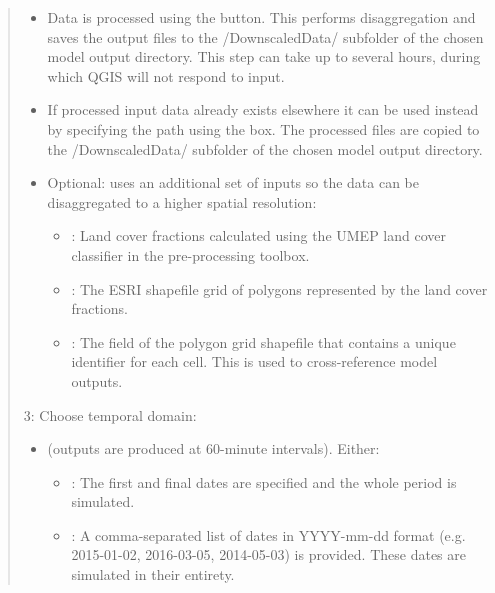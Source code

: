 \documentclass[letterpaper,10pt,english]{sphinxmanual}
\begin{document}
\begin{quote}
\begin{itemize}
\item {} 
Data is processed using the  button. This performs disaggregation and saves the output files to the /DownscaledData/ subfolder of the chosen model output directory. This step can take up to several hours, during which QGIS will not respond to input.

\item {} 
If processed input data already exists elsewhere it can be used instead by specifying the path using the  box. The processed files are copied to the /DownscaledData/ subfolder of the chosen model output directory.

\item {} 
Optional:  uses an additional set of inputs so the data can be disaggregated to a higher spatial resolution:
\begin{itemize}
\item {} 
: Land cover fractions calculated using the UMEP land cover classifier in the pre-processing toolbox.

\item {} 
: The ESRI shapefile grid of polygons represented by the land cover fractions.

\item {} 
: The field of the polygon grid shapefile that contains a unique identifier for each cell. This is used to cross-reference model outputs.

\end{itemize}

\end{itemize}

3: Choose temporal domain:
\begin{itemize}
\item {} 
 (outputs are produced at 60-minute intervals). Either:
\begin{itemize}
\item {} 
: The first and final dates are specified and the whole period is simulated.

\item {} 
: A comma-separated list of dates in YYYY-mm-dd format (e.g. 2015-01-02, 2016-03-05, 2014-05-03) is provided. These dates are simulated in their entirety.


\end{itemize}
\end{itemize}
\end{quote}
\end{document}
